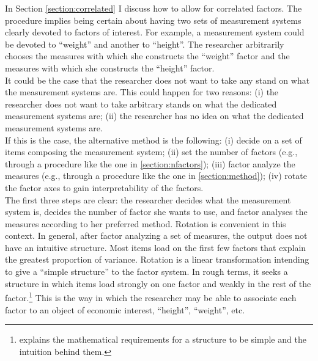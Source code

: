 \noindent In Section \ref{section:correlated} I discuss how to allow for correlated factors. The procedure implies being certain about having two sets of measurement systems clearly devoted to factors of interest. For example, a measurement system could be devoted to ``weight'' and another to ``height''. The researcher arbitrarily chooses the measures with which she constructs the ``weight'' factor and the measures with which she constructs the ``height'' factor.\\
\indent It could be the case that the researcher does not want to take any stand on what the measurement systems are. This could happen for two reasons: (i) the researcher does not want to take arbitrary stands on what the dedicated measurement systems are; (ii) the researcher has no idea on what the dedicated measurement systems are.\\
\indent If this is the case, the alternative method is the following: (i) decide on a set of items composing the measurement system; (ii) set the number of factors (e.g.,  through a procedure like the one in  \ref{section:nfactors}); (iii) factor analyze the measures (e.g.,  through a procedure like the one in \ref{section:method}); (iv) rotate the factor axes to gain interpretability of the factors.\\
\indent The first three steps are clear: the researcher decides what the measurement system is, decides the number of factor she wants to use, and factor analyses the measures according to her preferred method. Rotation is convenient in this context. In general, after factor analyzing a set of measures, the output does not have an intuitive structure. Most items load on the first few factors that explain the greatest proportion of variance. Rotation is a linear transformation intending to give a ``simple structure'' to the factor system. In rough terms, it seeks a structure in which items load strongly on one factor and weakly in the rest of the factor.\footnote{\citet{abdi2003factor} explains the mathematical requirements for a structure to be simple and the intuition behind them.} This is the way in which the researcher may be able to associate each factor to an object of economic interest, ``height'', ``weight'', etc.\\ 